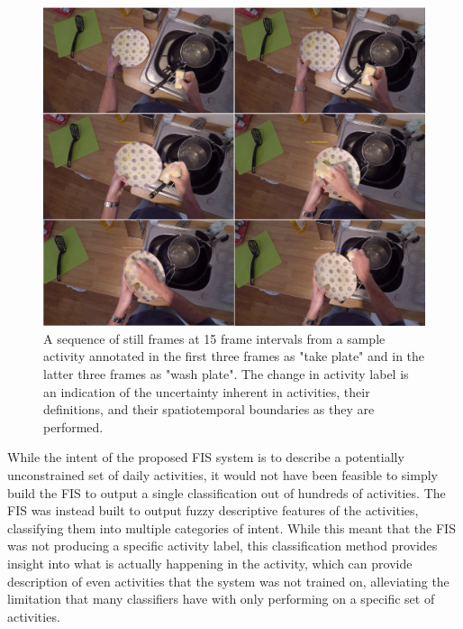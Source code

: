 \documentclass[12pt]{report}
\begin{document}
\begin{figure}[t]
\centerline{\includegraphics[width=.9\linewidth]{figure/wash_plate.png}}
\caption{A sequence of still frames at 15 frame intervals from a sample activity annotated in the first three frames as "take plate" and in the latter three frames as "wash plate". The change in activity label is an indication of the uncertainty inherent in activities, their definitions, and their spatiotemporal boundaries as they are performed.}
\label{wash_plate}
\end{figure}

While the intent of the proposed FIS system is to describe a potentially unconstrained set of daily activities, it would not have been feasible to simply build the FIS to output a single classification out of hundreds of activities. The FIS was instead built to output fuzzy descriptive features of the activities, classifying them into multiple categories of intent. While this meant that the FIS was not producing a specific activity label, this classification method provides insight into what is actually happening in the activity, which can provide description of even activities that the system was not trained on, alleviating the limitation that many classifiers have with only performing on a specific set of activities.
\end{document}
